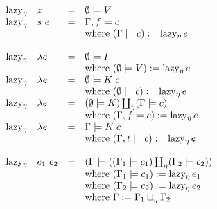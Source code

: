 \documentclass[conference]{IEEEtran}
\DeclareMathOperator{\lazyeta}{lazy_\eta}
\begin{document}
\begin{equation*}
    \begin{array}{l l l l}
        \lazyeta & z         & = & \emptyset \models V                                                          \\
        \lazyeta & s \ e     & = & \Gamma,f \models c                                                           \\
                 &           &   & \text{where } (\Gamma \models c) := \lazyeta e                               \\
        \\
        \lazyeta & \lambda e & = & \emptyset \models I                                                          \\
                 &           &   & \text{where } (\emptyset \models V) := \lazyeta e                            \\
        \lazyeta & \lambda e & = & \emptyset \models K \; c                                                     \\
                 &           &   & \text{where } (\emptyset \models c) := \lazyeta e                            \\
        \lazyeta & \lambda e & = & (\emptyset \models K) \coprod_\eta (\Gamma \models c)                        \\
                 &           &   & \text{where } (\Gamma,f \models c) := \lazyeta e                             \\
        \lazyeta & \lambda e & = & \Gamma \models K \; c                                                        \\
                 &           &   & \text{where } (\Gamma,t \models c) := \lazyeta e                             \\
        \\
        \lazyeta & e_1 \ e_2 & = & (\Gamma \models ((\Gamma_1 \models c_1) \coprod_\eta (\Gamma_2 \models c_2)) \\
                 &           &   & \text{where } (\Gamma_1 \models c_1) := \lazyeta e_1                         \\
                 &           &   & \text{where } (\Gamma_2 \models c_2) := \lazyeta e_2                         \\
                 &           &   & \text{where } \Gamma := \Gamma_1 \sqcup_\eta \Gamma_2                        \\
    \end{array}
\end{equation*}
\end{document}
